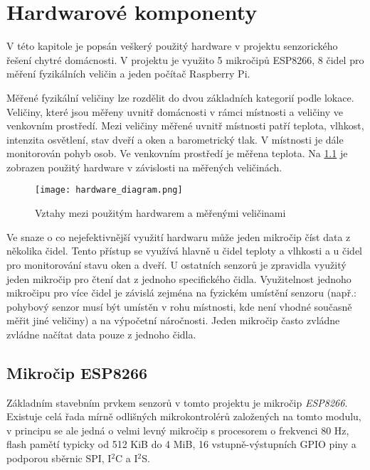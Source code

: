 \chapter{Hardwarové komponenty} \label{chap:hardware}
V této kapitole je popsán veškerý použitý hardware v projektu senzorického řešení chytré domácnosti. V projektu je využito 5 mikročipů ESP8266, 8 čidel pro měření fyzikálních veličin a jeden počítač Raspberry Pi. 

Měřené fyzikální veličiny lze rozdělit do dvou základních kategorií podle lokace. Veličiny, které jsou měřeny uvnitř domácnosti v rámci místnosti a veličiny ve venkovním prostředí. Mezi veličiny měřené uvnitř místnosti patří teplota, vlhkost, intenzita osvětlení, stav dveří a oken a barometrický tlak. V místnosti je dále monitorován pohyb osob. Ve venkovním prostředí je měřena teplota. Na \cref{fig:hardware_diagram} je zobrazen použitý hardware v závislosti na měřených veličinách. 

\begin{figure}[H]
  \centering
  \texttt{[image: hardware\_diagram.png]}
  \caption{Vztahy mezi použitým hardwarem a měřenými veličinami}
  \label{fig:hardware_diagram}
\end{figure}

Ve snaze o co nejefektivnější využití hardwaru může jeden mikročip číst data z několika čidel. Tento přístup se využívá hlavně u čidel teploty a vlhkosti a u čidel pro monitorování stavu oken a dveří. U ostatních senzorů je zpravidla využitý jeden mikročip pro čtení dat z jednoho specifického čidla. Využitelnost jednoho mikročipu pro více čidel je závislá zejména na fyzickém umístění senzoru (např.: pohybový senzor musí být umístěn v rohu místnosti, kde není vhodné současně měřit jiné veličiny) a na výpočetní náročnosti. Jeden mikročip často zvládne zvládne načítat data pouze z jednoho čidla.

\section{Mikročip ESP8266} \label{sec:esp8266}

Základním stavebním prvkem senzorů v tomto projektu je mikročip \textit{ESP8266}. Existuje celá řada mírně odlišných mikrokontrolérů založených na tomto modulu, v principu se ale jedná o velmi levný mikročip s procesorem o frekvenci 80 Hz, flash pamětí typicky od 512 KiB do 4 MiB, 16 vstupně-výstupních GPIO piny a podporou sběrnic SPI,  I$^2$C a I$^2$S.

